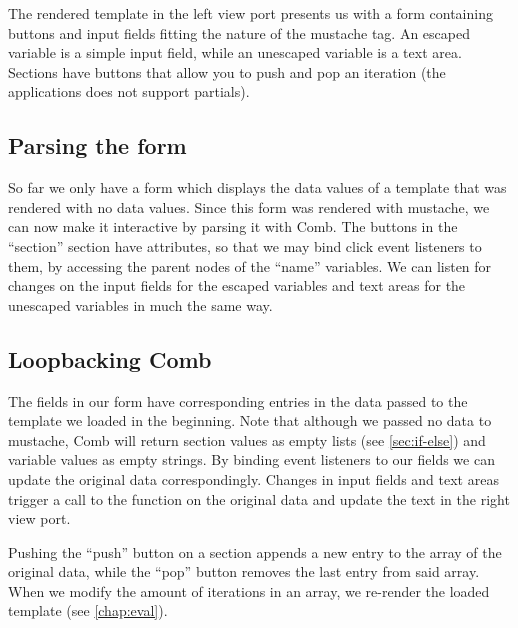 The rendered template in the left view port presents us with a form containing
buttons and input fields fitting the nature of the mustache tag.
An escaped variable is a simple input field,
while an unescaped variable is a text area.
Sections have buttons that allow you to push and pop an iteration
(the applications does not support partials).

\subsection{Parsing the form}

So far we only have a form which displays the data values of a template that was
rendered with no data values.
Since this form was rendered with mustache, we can now make it interactive by
parsing it with Comb. The buttons in the ``section'' section have
 attributes, so that we may bind click event listeners to
them, by accessing the parent nodes of the ``name'' variables. We can listen
for changes on the input fields for the escaped variables and text areas for the
unescaped variables in much the same way.

\subsection{Loopbacking Comb}

The fields in our form have corresponding entries in the data passed to
the template we loaded in the beginning.
Note that although we passed no data to mustache, Comb will return
section values as empty lists (see \ref{sec:if-else}) and
variable values as empty strings.
By binding event listeners to our fields we can update the original data
correspondingly. Changes in input fields and text areas trigger a call to the
 function on the original data and update the text in the
right view port.

Pushing the ``push'' button on a section appends a new entry to the array of the
original data, while the ``pop'' button removes the last entry from said array.
When we modify the amount of iterations in an array, we re-render the loaded
template (see \ref{chap:eval}).



